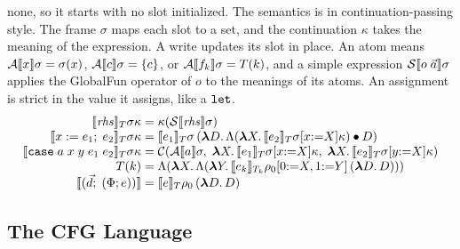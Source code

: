 none, so it starts with no slot initialized.
The semantics is in continuation-passing style. The frame
$\sigma$ maps each slot to a set, and the continuation $\kappa$ takes
the meaning of the expression. A write updates its slot in place. An
atom means $\mathcal{A}\llbracket x \rrbracket\sigma = \sigma(x)$,
$\mathcal{A}\llbracket c \rrbracket\sigma = \{c\}$, or
$\mathcal{A}\llbracket f_k \rrbracket\sigma = T(k)$, and a simple expression
$\mathcal{S}\llbracket o\;\vec{a} \rrbracket\sigma$ applies the GlobalFun operator of
$o$ to the meanings of its atoms. An assignment is strict in the value
it assigns, like a $\mathtt{let}$.
{\small\figdefs
{}
\[
\begin{array}{@{}r@{\;}c@{\;}l@{}}
  \den{\rhs}_T\sigma\kappa & = & \kappa(\mathcal{S}\den{\rhs}\sigma)\\
  \den{x \mathrel{:=} e_1;\; e_2}_T\sigma\kappa & = &
    \den{e_1}_T\sigma\,(\mlam{D} \Lambda(\mlam{X} \den{e_2}_T\sigma[x{:=}X]\kappa) \app D)\\
  \den{\kw{case}\;a\;x\;y\;e_1\;e_2}_T\sigma\kappa & = &
    \mathcal{C}(\mathcal{A}\den{a}\sigma,\;
      \mlam{X} \den{e_1}_T\sigma[x{:=}X]\kappa,\;
      \mlam{X} \den{e_2}_T\sigma[y{:=}X]\kappa)\\
  T(k) & = & \Lambda(\mlam{X} \Lambda(\mlam{Y}
    \den{e_k}_{T_k}\rho_0[0{:=}X, 1{:=}Y]\,(\mlam{D} D)))\\
  \den{(\vec{d};\; (\Phi; e))} & = & \den{e}_T\rho_0\,(\mlam{D} D)
\end{array}
\]
}

\subsection{The CFG Language}
\label{app:cfg}

